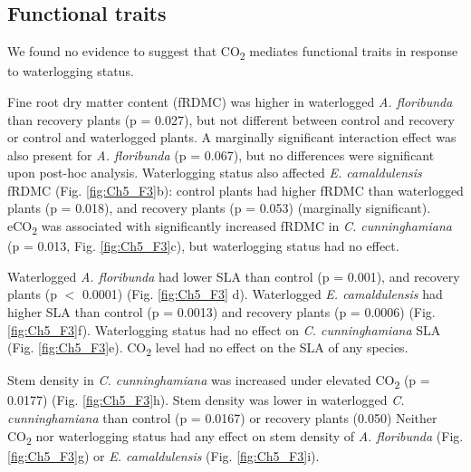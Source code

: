 \documentclass[12pt,a4paper]{memoir}
\begin{document}
\subsection*{Functional traits}
We found no evidence to suggest that CO\textsubscript{2} mediates functional traits in response to waterlogging status.

Fine root dry matter content (fRDMC) was higher in waterlogged \textit{A. floribunda} than recovery plants (p = 0.027), but not different between control and recovery or control and waterlogged plants. A marginally significant interaction effect was also present for \textit{A. floribunda} (p = 0.067), but no differences were significant upon post-hoc analysis. Waterlogging status also affected \textit{E. camaldulensis} fRDMC (Fig. \ref{fig:Ch5_F3}b): control plants had higher fRDMC than waterlogged plants (p = 0.018), and recovery plants (p = 0.053) (marginally significant). eCO\textsubscript{2} was associated with significantly increased fRDMC in \textit{C. cunninghamiana} (p = 0.013, Fig. \ref{fig:Ch5_F3}c), but waterlogging status had no effect.

Waterlogged \textit{A. floribunda} had lower SLA than control (p = 0.001), and recovery plants (p $<$ 0.0001) (Fig. \ref{fig:Ch5_F3} d). Waterlogged \textit{E. camaldulensis} had higher SLA than control (p = 0.0013) and recovery plants (p = 0.0006) (Fig. \ref{fig:Ch5_F3}f). Waterlogging status had no effect on \textit{C. cunninghamiana} SLA (Fig. \ref{fig:Ch5_F3}e). CO\textsubscript{2} level had no effect on the SLA of any species. 

Stem density in \textit{C. cunninghamiana} was increased under elevated CO\textsubscript{2} (p = 0.0177) (Fig. \ref{fig:Ch5_F3}h). Stem density was lower in waterlogged \textit{C. cunninghamiana} than control (p = 0.0167) or recovery plants (0.050) Neither CO\textsubscript{2} nor waterlogging status had any effect on stem density of \textit{A. floribunda} (Fig. \ref{fig:Ch5_F3}g) or \textit{E. camaldulensis} (Fig. \ref{fig:Ch5_F3}i).
\end{document}
